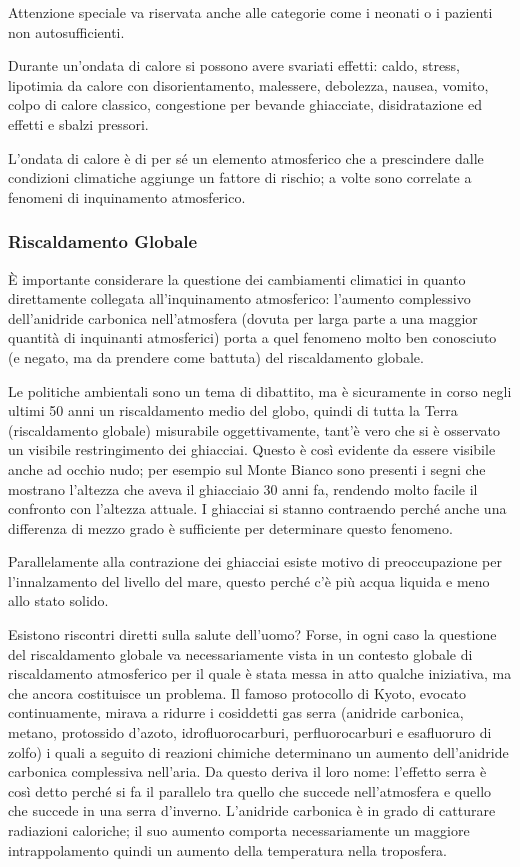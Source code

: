 Attenzione speciale va riservata anche alle categorie come i neonati o i
pazienti non autosufficienti.

Durante un'ondata di calore si possono avere svariati effetti: caldo,
stress, lipotimia da calore con disorientamento, malessere, debolezza,
nausea, vomito, colpo di calore classico, congestione per bevande
ghiacciate, disidratazione ed effetti e sbalzi pressori.

L'ondata di calore è di per sé un elemento atmosferico che a prescindere
dalle condizioni climatiche aggiunge un fattore di rischio; a volte sono
correlate a fenomeni di inquinamento atmosferico.

\subsubsection{Riscaldamento Globale}


È importante considerare la questione dei cambiamenti climatici in
quanto direttamente collegata all'inquinamento atmosferico: l'aumento
complessivo dell'anidride carbonica nell'atmosfera (dovuta per larga
parte a una maggior quantità di inquinanti atmosferici) porta a quel
fenomeno molto ben conosciuto (e negato, ma da prendere come battuta)
del riscaldamento globale.

Le politiche ambientali sono un tema di dibattito, ma è sicuramente in
corso negli ultimi 50 anni un riscaldamento medio del globo, quindi di
tutta la Terra (riscaldamento globale) misurabile oggettivamente, tant'è
vero che si è osservato un visibile restringimento dei ghiacciai. Questo
è così evidente da essere visibile anche ad occhio nudo; per esempio sul
Monte Bianco sono presenti i segni che mostrano l'altezza che aveva il
ghiacciaio 30 anni fa, rendendo molto facile il confronto con l'altezza
attuale. I ghiacciai si stanno contraendo perché anche una differenza di
mezzo grado è sufficiente per determinare questo fenomeno.

Parallelamente alla contrazione dei ghiacciai esiste motivo di
preoccupazione per l'innalzamento del livello del mare, questo perché
c'è più acqua liquida e meno allo stato solido.

Esistono riscontri diretti sulla salute dell'uomo? Forse, in ogni caso
la questione del riscaldamento globale va necessariamente vista in un
contesto globale di riscaldamento atmosferico per il quale è stata messa
in atto qualche iniziativa, ma che ancora costituisce un problema. Il
famoso protocollo di Kyoto, evocato continuamente, mirava a ridurre i
cosiddetti gas serra (anidride carbonica, metano, protossido d'azoto,
idrofluorocarburi, perfluorocarburi e esafluoruro di zolfo) i quali a
seguito di reazioni chimiche determinano un aumento dell'anidride
carbonica complessiva nell'aria. Da questo deriva il loro nome:
l'effetto serra è così detto perché si fa il parallelo tra quello che
succede nell'atmosfera e quello che succede in una serra d'inverno.
L'anidride carbonica è in grado di catturare radiazioni caloriche; il
suo aumento comporta necessariamente un maggiore intrappolamento quindi
un aumento della temperatura nella troposfera.

